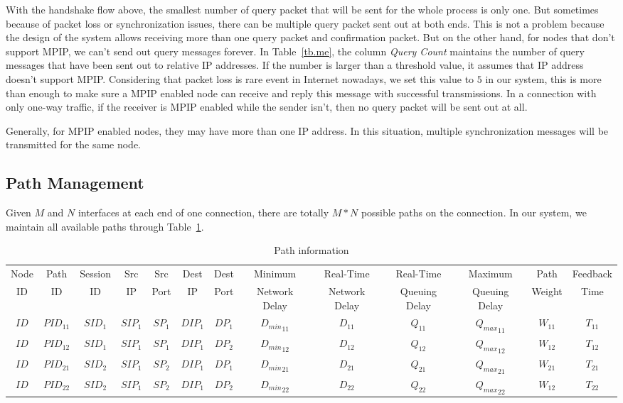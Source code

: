 With the handshake flow above, the smallest number of query packet that will be sent for the whole process is only one. But sometimes because of packet loss or synchronization issues, there can be multiple query packet sent out at both ends. This is not a problem because the design of the system allows receiving more than one query packet and confirmation packet. But on the other hand, for nodes that don't support MPIP, we can't send out query messages forever. In Table~\ref{tb.me}, the column \emph{Query Count} maintains the number of query messages that have been sent out to relative IP addresses. If the number is larger than a threshold value, it assumes that IP address doesn't support MPIP. Considering that packet loss is rare event in Internet nowadays, we set this value to $5$ in our system, this is more than enough to make sure a MPIP enabled node can receive and reply this message with successful transmissions. In a connection with only one-way traffic, if the receiver is MPIP enabled while the sender isn't, then no query packet will be sent out at all.

Generally, for MPIP enabled nodes, they may have more than one IP address. In this situation, multiple synchronization messages will be transmitted for the same node.


\subsection{Path Management}
\label{sec:path}

Given $M$ and $N$ interfaces at each end of one connection, there are totally $M*N$ possible paths on the connection. In our system, we maintain all available paths through Table~\ref{tb.pi}.

\begin{table}
\small
\caption{\label{tb.pi}Path information}
\centering
\begin{tabular}{|c|c|c|c|c|c|c|c|c|c|c|c|c|}
\hline
Node &  Path & Session & Src &   Src & Dest & Dest &   Minimum       & Real-Time      & Real-Time      & Maximum       & Path    & Feedback\\
 ID  &   ID  & ID & IP  &  Port &  IP  & Port &  Network Delay  & Network Delay  & Queuing Delay  & Queuing Delay & Weight  & Time\\
\hline
$ID$&${PID}_{11}$&${SID}_{1}$&${SIP}_{1}$&${SP}_{1}$&${DIP}_{1}$&${DP}_{1}$&${D_{min}}_{11}$&$D_{11}$&${Q}_{11}$&${{Q}_{max}}_{11}$&$W_{11}$&$T_{11}$ \\
\hline
$ID$&${PID}_{12}$&${SID}_{1}$&${SIP}_{1}$&${SP}_{1}$&${DIP}_{1}$&${DP}_{2}$&${D_{min}}_{12}$&$D_{12}$&${Q}_{12}$&${{Q}_{max}}_{12}$&$W_{12}$&$T_{12}$ \\
\hline
$ID$&${PID}_{21}$&${SID}_{2}$&${SIP}_{1}$&${SP}_{2}$&${DIP}_{1}$&${DP}_{1}$&${D_{min}}_{21}$&$D_{21}$&${Q}_{21}$&${{Q}_{max}}_{21}$&$W_{21}$&$T_{21}$ \\
\hline
$ID$&${PID}_{22}$&${SID}_{2}$&${SIP}_{1}$&${SP}_{2}$&${DIP}_{1}$&${DP}_{2}$&${D_{min}}_{22}$&$D_{22}$&${Q}_{22}$&${{Q}_{max}}_{22}$&$W_{12}$&$T_{22}$ \\
\hline
\end{tabular}
\end{table}


